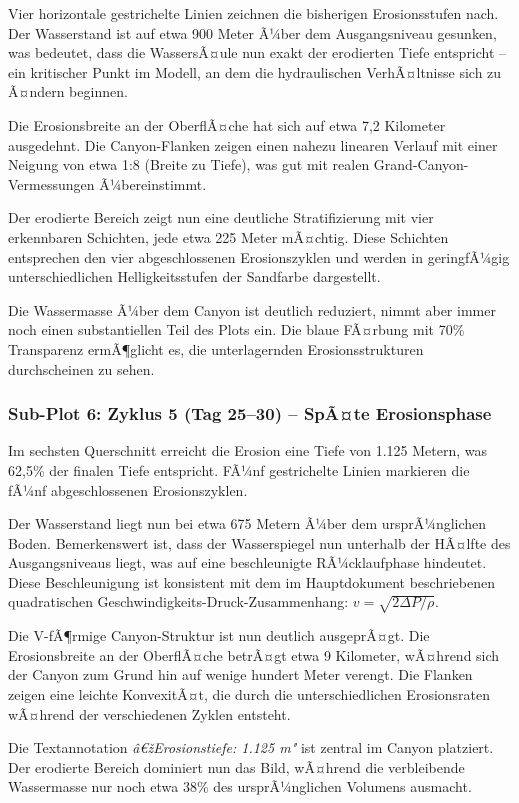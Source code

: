 Vier horizontale gestrichelte Linien zeichnen die bisherigen Erosionsstufen nach. Der Wasserstand ist auf etwa 900 Meter Ã¼ber dem Ausgangsniveau gesunken, was bedeutet, dass die WassersÃ¤ule nun exakt der erodierten Tiefe entspricht -- ein kritischer Punkt im Modell, an dem die hydraulischen VerhÃ¤ltnisse sich zu Ã¤ndern beginnen.

Die Erosionsbreite an der OberflÃ¤che hat sich auf etwa 7,2 Kilometer ausgedehnt. Die Canyon-Flanken zeigen einen nahezu linearen Verlauf mit einer Neigung von etwa 1:8 (Breite zu Tiefe), was gut mit realen Grand-Canyon-Vermessungen Ã¼bereinstimmt.

Der erodierte Bereich zeigt nun eine deutliche Stratifizierung mit vier erkennbaren Schichten, jede etwa 225 Meter mÃ¤chtig. Diese Schichten entsprechen den vier abgeschlossenen Erosionszyklen und werden in geringfÃ¼gig unterschiedlichen Helligkeitsstufen der Sandfarbe dargestellt.

Die Wassermasse Ã¼ber dem Canyon ist deutlich reduziert, nimmt aber immer noch einen substantiellen Teil des Plots ein. Die blaue FÃ¤rbung mit 70\% Transparenz ermÃ¶glicht es, die unterlagernden Erosionsstrukturen durchscheinen zu sehen.

\subsubsection*{Sub-Plot 6: Zyklus 5 (Tag 25--30) -- SpÃ¤te Erosionsphase}

Im sechsten Querschnitt erreicht die Erosion eine Tiefe von 1.125 Metern, was 62,5\% der finalen Tiefe entspricht. FÃ¼nf gestrichelte Linien markieren die fÃ¼nf abgeschlossenen Erosionszyklen.

Der Wasserstand liegt nun bei etwa 675 Metern Ã¼ber dem ursprÃ¼nglichen Boden. Bemerkenswert ist, dass der Wasserspiegel nun unterhalb der HÃ¤lfte des Ausgangsniveaus liegt, was auf eine beschleunigte RÃ¼cklaufphase hindeutet. Diese Beschleunigung ist konsistent mit dem im Hauptdokument beschriebenen quadratischen Geschwindigkeits-Druck-Zusammenhang: $v = \sqrt{2\Delta P / \rho}$.

Die V-fÃ¶rmige Canyon-Struktur ist nun deutlich ausgeprÃ¤gt. Die Erosionsbreite an der OberflÃ¤che betrÃ¤gt etwa 9 Kilometer, wÃ¤hrend sich der Canyon zum Grund hin auf wenige hundert Meter verengt. Die Flanken zeigen eine leichte KonvexitÃ¤t, die durch die unterschiedlichen Erosionsraten wÃ¤hrend der verschiedenen Zyklen entsteht.

Die Textannotation \textit{â€žErosionstiefe: 1.125 m"} ist zentral im Canyon platziert. Der erodierte Bereich dominiert nun das Bild, wÃ¤hrend die verbleibende Wassermasse nur noch etwa 38\% des ursprÃ¼nglichen Volumens ausmacht.

